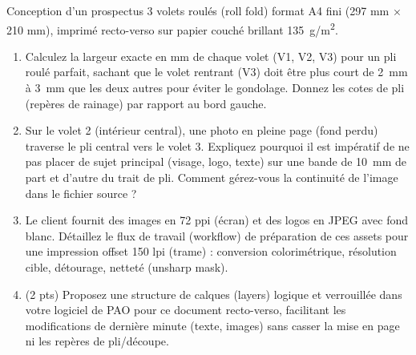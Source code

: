 \documentclass[11pt]{article}
\begin{document}
\begin{exercice}
Conception d'un prospectus 3 volets roulés (roll fold) format A4 fini (297 mm × 210 mm), imprimé recto-verso sur papier couché brillant \SI{135}{g/m^2}.

\begin{enumerate}
    \item Calculez la largeur exacte en mm de chaque volet (V1, V2, V3) pour un pli roulé parfait, sachant que le volet rentrant (V3) doit être plus court de \SI{2}{mm} à \SI{3}{mm} que les deux autres pour éviter le gondolage. Donnez les cotes de pli (repères de rainage) par rapport au bord gauche.
    \item Sur le volet 2 (intérieur central), une photo en pleine page (fond perdu) traverse le pli central vers le volet 3. Expliquez pourquoi il est impératif de ne pas placer de sujet principal (visage, logo, texte) sur une bande de \SI{10}{mm} de part et d'autre du trait de pli. Comment gérez-vous la continuité de l'image dans le fichier source ?
    \item Le client fournit des images en 72 ppi (écran) et des logos en JPEG avec fond blanc. Détaillez le flux de travail (workflow) de préparation de ces assets pour une impression offset 150 lpi (trame) : conversion colorimétrique, résolution cible, détourage, netteté (unsharp mask).
    \item (2 pts) Proposez une structure de calques (layers) logique et verrouillée dans votre logiciel de PAO pour ce document recto-verso, facilitant les modifications de dernière minute (texte, images) sans casser la mise en page ni les repères de pli/découpe.
\end{enumerate}
\end{exercice}
\end{document}
